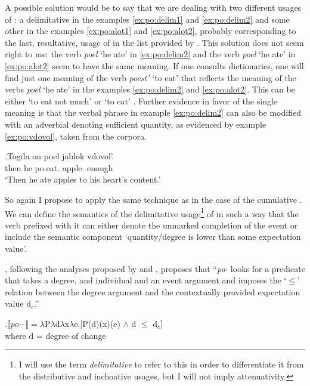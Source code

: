 A possible solution would be to say that we are dealing with two different usages of : a delimitative in the examples \ref{ex:po:delim1} and \ref{ex:po:delim2} and some other in the examples \ref{ex:po:alot1} and \ref{ex:po:alot2}, probably corresponding to the last, resultative, usage of  in the list provided by \citet{Shvedova:82}. This solution does not seem right to me: the verb \textit{poel} `he ate' in \ref{ex:po:delim2} and the verb \textit{poel} `he ate' in \ref{ex:po:alot2} seem to have the same meaning. If one consults dictionaries, one will find just one meaning of the verb \textit{poest'} `to eat' that reflects the meaning of the verbs \textit{poel} `he ate' in the examples \ref{ex:po:delim2} and \ref{ex:po:alot2}. This can be either `to eat not much' \citep{Ushakov:50} or `to eat' \citep{Efremova:00}. Further evidence in favor of the single meaning is that the verbal phrase in example \ref{ex:po:delim2} can also be modified with an adverbial denoting sufficient quantity, as evidenced by example \ref{ex:po:vdovol}, taken from the corpora.

\exg.\label{ex:po:vdovol}Togda on poel jablok vdovol'.\\
then he po.eat. apple. enough\\
\trans `Then he ate apples to his heart's content.'\\

So again I propose to apply the same technique as in the case of the cumulative . We can define the semantics of the delimitative usage\footnote{I will use the term \textit{delimitative} to refer to this in order to differentiate it from the distributive and inchoative usages, but I will not imply attenuativity.} of  in such a way that the verb prefixed with it can either denote the unmarked completion of the event or include the semantic component `quantity/degree is lower than some expectation value'. 

\citet[48]{Kagan:book}, following the analyses proposed by \citet{Filip:00} and \citet{Souchkova:04}, proposes that ``\textit{po}- looks for a predicate that takes a degree, and individual and an event argument and imposes the `$\leqslant$' relation between the degree argument and the contextually provided expectation value d$_c$.''

\ex.\label{Kagan:po}$\llbracket po- \rrbracket = \lambda$P$\lambda$d$\lambda$x$\lambda$e.[P(d)(x)(e) $\wedge$ d $\leqslant$ d$_c$]\\
where d = degree of change \citep{KennedyLevin:02}

